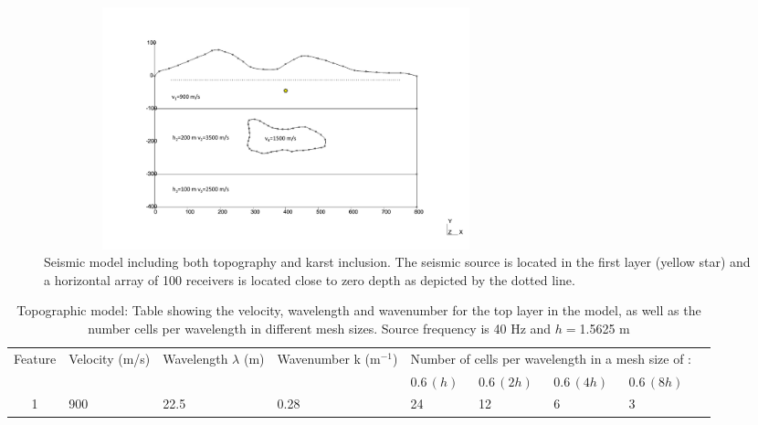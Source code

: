  \begin{figure}[h!]
	\centering
	\includegraphics[width=14cm, height=7cm]{Thesis_Edith/figures/topo/topo_source.pdf}
	\caption{Seismic model including both topography and karst inclusion. The seismic source is located in the first layer (yellow star) and a horizontal array of 100 receivers is located close to zero depth as depicted by the dotted line.}
	\label{fig:3.37}
\end{figure}

\begin{table}[h!]
\footnotesize
\centering
    \begin{tabular}{|c|m{1.5cm}|m{2cm}|m{2cm}|m{1cm}| m{1.2cm}|m{1.2cm}|m{1.2cm}|m{1.2cm}|}
      \hline
      \multirow{2}{*}{Feature} &
      \multirow{2}{1.5cm}{Velocity (m/s)} &
      \multirow{2}{2cm}{Wavelength \quad $\lambda$ (m)} &
      \multirow{2}{2cm}{Wavenumber  k (m$^{-1}$)} &
         \multicolumn{4}{m{6 cm}|}{Number of cells per wavelength in a mesh size of :} \\
         & &  &  & $0.6 \, (h)$ & $ 0.6 \, (2h)$ & $ 0.6 \, (4h) $ & $ 0.6 \, (8h)$ \\
      \hline
      1 & 900 & 22.5 & 0.28 & 24 & 12 & 6  & 3 \\
     \hline
    \end{tabular}
    \caption{Topographic model: Table showing the velocity, wavelength and wavenumber for the top layer in the model, as well as the number cells per wavelength in different mesh sizes. Source frequency is 40 Hz and $h=$1.5625 m}
    \label{table:3.3}
\end{table}

